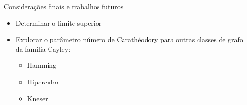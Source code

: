\begin{frame}{Considerações finais e trabalhos futuros}
    \begin{itemize}
        \tightlist
        \item Determinar o limite superior
        \item Explorar o parâmetro número de Carathéodory para outras classes de grafo da família Cayley:
              \begin{itemize}
                  \tightlist
                  \item Hamming
                  \item Hipercubo
                  \item Kneser
              \end{itemize}
    \end{itemize}
\end{frame}